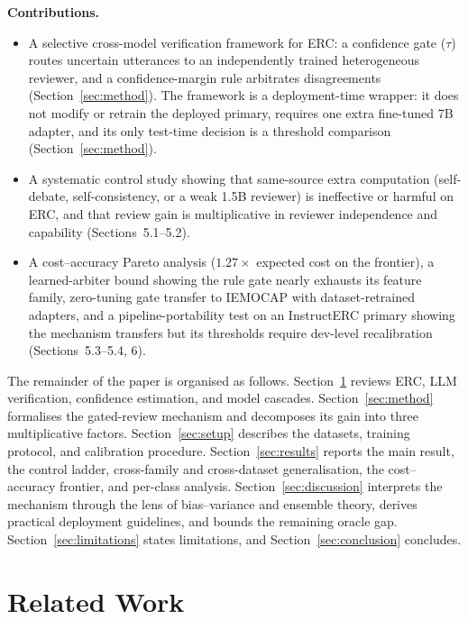 \documentclass[final,5p,times,twocolumn]{elsarticle}
\begin{document}
\noindent\textbf{Contributions.}
\begin{itemize}
  \item A selective cross-model verification framework for ERC: a
  confidence gate ($\tau$) routes uncertain utterances to an independently
  trained heterogeneous reviewer, and a confidence-margin rule arbitrates
  disagreements (Section~\ref{sec:method}). The framework is a
  deployment-time wrapper: it does not modify or retrain the deployed
  primary, requires one extra fine-tuned 7B adapter, and its only
  test-time decision is a threshold comparison
  (Section~\ref{sec:method}).
  \item A systematic control study showing that same-source extra
  computation (self-debate, self-consistency, or a weak 1.5B
  reviewer) is ineffective or harmful on ERC, and that review gain is
  multiplicative in reviewer independence and capability
  (Sections~5.1--5.2).
  \item A cost--accuracy Pareto analysis ($1.27\times$ expected cost on the
  frontier), a learned-arbiter bound showing the rule gate nearly exhausts
  its feature family, zero-tuning gate transfer to IEMOCAP with
  dataset-retrained adapters, and a
  pipeline-portability test on an InstructERC primary showing the mechanism
  transfers but its thresholds require dev-level recalibration
  (Sections~5.3--5.4, 6).
\end{itemize}

The remainder of the paper is organised as follows.
Section~\ref{sec:related} reviews ERC, LLM verification, confidence
estimation, and model cascades. Section~\ref{sec:method} formalises the
gated-review mechanism and decomposes its gain into three multiplicative
factors. Section~\ref{sec:setup} describes the datasets, training protocol,
and calibration procedure. Section~\ref{sec:results} reports the main
result, the control ladder, cross-family and cross-dataset generalisation,
the cost--accuracy frontier, and per-class analysis.
Section~\ref{sec:discussion} interprets the mechanism through the lens of
bias--variance and ensemble theory, derives practical deployment
guidelines, and bounds the remaining oracle gap. Section~\ref{sec:limitations}
states limitations, and Section~\ref{sec:conclusion} concludes.

\section{Related Work}
\label{sec:related}
\end{document}
